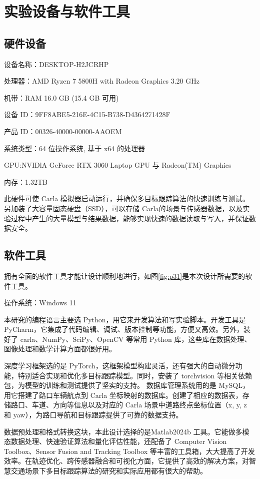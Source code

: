 	


\section{实验设备与软件工具}

\subsection{硬件设备}

设备名称：DESKTOP-H2JCRHP

处理器：AMD Ryzen 7 5800H with Radeon Graphics            3.20 GHz

机带：RAM	16.0 GB (15.4 GB 可用)

设备 ID：9FF8ABE5-216E-4C15-B738-D4364271428F

产品 ID：00326-40000-00000-AAOEM

系统类型：64 位操作系统, 基于 x64 的处理器

GPU:NVIDlA GeForce RTX 3060 Laptop GPU 与 Radeon(TM) Graphics

内存：1.32TB

此硬件可使 Carla 模拟器启动运行，并确保多目标跟踪算法的快速训练与测试。另加装了大容量固态硬盘（SSD），可以存储 Carla的场景与传感器数据，以及实验过程中产生的大量模型与结果数据，能够实现快速的数据读取与写入，并保证数据安全。

\subsection{软件工具}

拥有全面的软件工具才能让设计顺利地进行，如图\ref{fig:p31}是本次设计所需要的软件工具。

操作系统：Windows 11

本研究的编程语言主要选 Python，用它来开发算法和写实验脚本。开发工具是 PyCharm，它集成了代码编辑、调试、版本控制等功能，方便又高效。另外，装好了 carla、NumPy、SciPy、OpenCV 等常用 Python 库，这些库在数据处理、图像处理和数学计算方面都很好用。

深度学习框架选的是 PyTorch，这框架模型构建灵活，还有强大的自动微分功能，特别适合实现和优化多目标跟踪模型。同时，安装了 torchvision 等相关依赖包，为模型的训练和测试提供了坚实的支持。
数据库管理系统用的是 MySQL，用它搭建了路口车辆航点到 Carla 坐标映射的数据库。创建了相应的数据表，存储路口、车道、方向等信息以及对应的 Carla 场景中道路终点坐标位置（x, y, z 和 yaw），为路口导航和目标跟踪提供了可靠的数据支持。

数据预处理和格式转换这块，本此设计选择的是Matlab2024b 工具。它能做多模态数据处理、快速验证算法和量化评估性能，还配备了 Computer Vision Toolbox、Sensor Fusion and Tracking Toolbox 等丰富的工具箱，大大提高了开发效率。在轨迹优化、跨传感器融合和可视化方面，它提供了高效的解决方案，对智慧交通场景下多目标跟踪算法的研究和实际应用都有很大的帮助。





